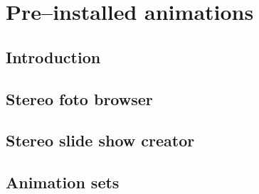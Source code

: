 \chapter{Pre--installed animations}

\section{Introduction}


\section{Stereo foto browser}

\section{Stereo slide show creator}

\section{Animation sets}

